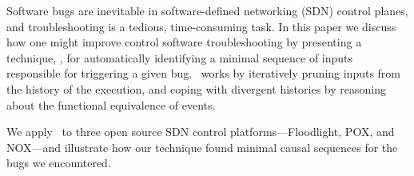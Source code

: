 Software bugs are inevitable in software-defined networking (SDN) control planes,
and troubleshooting
is a tedious, time-consuming task.
In this paper we discuss how one might improve
control software troubleshooting by presenting a technique, \simulator,
for automatically identifying
a minimal sequence of inputs responsible for triggering a given bug.
\Simulator~works by
iteratively pruning inputs from the history of the execution, and
coping with divergent histories by reasoning about the functional equivalence
of events.

We apply \simulator~to three open source SDN control
platforms---Floodlight, POX, and NOX---and
illustrate how our technique found minimal causal sequences for
the bugs we encountered.
